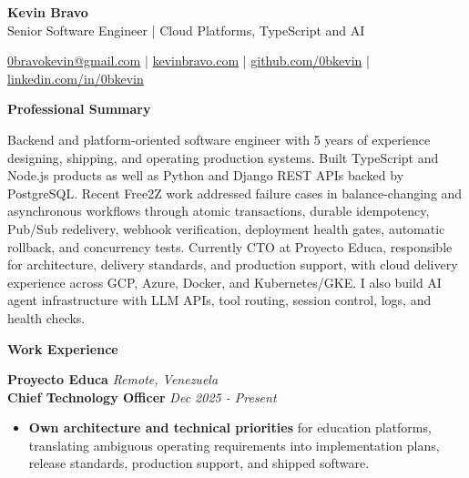 \documentclass[10pt]{article}
\newcommand{\sectiontitle}[1]{%
    \vspace{3pt}
    \begin{center}
        \textbf{#1}
    \end{center}
    \vspace{-5pt}
}
\begin{document}
\raggedright

\begin{center}
    {\LARGE \textbf{Kevin Bravo}}\\
    Senior Software Engineer | Cloud Platforms, TypeScript and AI \\
    \hrulefill
\end{center}

\begin{center}
    \href{mailto:0bravokevin@gmail.com}{0bravokevin@gmail.com}
    | \href{https://kevinbravo.com}{kevinbravo.com}
    | \href{https://github.com/0bkevin}{github.com/0bkevin}
    | \href{https://www.linkedin.com/in/0bkevin/}{linkedin.com/in/0bkevin}
\end{center}

\fontsize{9.55}{10.55}\selectfont

\sectiontitle{Professional Summary}
Backend and platform-oriented software engineer with 5 years of experience designing, shipping, and operating production systems. Built TypeScript and Node.js products as well as Python and Django REST APIs backed by PostgreSQL. Recent Free2Z work addressed failure cases in balance-changing and asynchronous workflows through atomic transactions, durable idempotency, Pub/Sub redelivery, webhook verification, deployment health gates, automatic rollback, and concurrency tests. Currently CTO at Proyecto Educa, responsible for architecture, delivery standards, and production support, with cloud delivery experience across GCP, Azure, Docker, and Kubernetes/GKE. I also build AI agent infrastructure with LLM APIs, tool routing, session control, logs, and health checks.

\sectiontitle{Work Experience}
\textbf{Proyecto Educa} \hfill \textit{Remote, Venezuela} \\
\textbf{Chief Technology Officer} \hfill \textit{Dec 2025 - Present}
\begin{itemize}
    \item \textbf{Own architecture and technical priorities} for education platforms, translating ambiguous operating requirements into implementation plans, release standards, production support, and shipped software.
\end{itemize}
\end{document}

